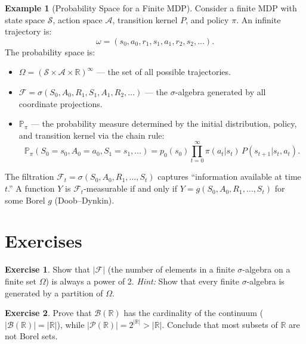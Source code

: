 \documentclass[11pt,a4paper]{article}
\theoremstyle{definition}
\newtheorem{example}{Example}[section]
\newtheorem{exercise}{Exercise}[section]
\theoremstyle{plain}
\theoremstyle{remark}
\newcommand{\R}{\mathbb{R}}
\newcommand{\Prob}{\mathbb{P}}
\newcommand{\powerset}{\mathcal{P}}
\newcommand{\Borel}{\mathcal{B}}
\begin{document}
\begin{example}[Probability Space for a Finite MDP]
\label{ex:mdp_prob_space}
Consider a finite MDP with state space $\mathcal{S}$, action space $\mathcal{A}$,
transition kernel $P$, and policy $\pi$. An infinite trajectory is:
\begin{equation}
    \omega = (s_0, a_0, r_1, s_1, a_1, r_2, s_2, \ldots).
\end{equation}
The probability space is:
\begin{itemize}[nosep]
    \item $\Omega = (\mathcal{S} \times \mathcal{A} \times \R)^\infty$ --- the set of all possible trajectories.
    \item $\mathcal{F} = \sigma(S_0, A_0, R_1, S_1, A_1, R_2, \ldots)$ --- the $\sigma$-algebra generated by all coordinate projections.
    \item $\Prob_\pi$ --- the probability measure determined by the initial distribution,
    policy, and transition kernel via the chain rule:
    \begin{equation}
        \Prob_\pi(S_0 = s_0, A_0 = a_0, S_1 = s_1, \ldots) = p_0(s_0) \prod_{t=0}^{\infty} \pi(a_t | s_t) \, P(s_{t+1} | s_t, a_t).
    \end{equation}
\end{itemize}
The filtration $\mathcal{F}_t = \sigma(S_0, A_0, R_1, \ldots, S_t)$ captures
``information available at time $t$.'' A function $Y$ is $\mathcal{F}_t$-measurable
if and only if $Y = g(S_0, A_0, R_1, \ldots, S_t)$ for some Borel $g$ (Doob--Dynkin).
\end{example}

\section{Exercises}
\label{sec:exercises}

\begin{exercise}
Show that $|\mathcal{F}|$ (the number of elements in a finite $\sigma$-algebra on a
finite set $\Omega$) is always a power of 2.
\textit{Hint:} Show that every finite $\sigma$-algebra is generated by a partition of $\Omega$.
\end{exercise}

\begin{exercise}
Prove that $\Borel(\R)$ has the cardinality of the continuum ($|\Borel(\R)| = |\R|$),
while $|\powerset(\R)| = 2^{|\R|} > |\R|$. Conclude that most subsets of $\R$ are not
Borel sets.
\end{exercise}
\end{document}
